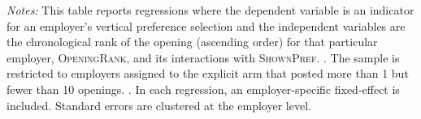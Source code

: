 
\begin{table}[!htbp] \centering 
  \caption{Employer vertical preference signal over time, by treatment assignemnt} 
  \label{tab:employer_choice_fe} 
\begin{minipage}{1\textwidth} 
 \emph{Notes:} This table reports regressions where the dependent variable is an indicator for an employer's vertical preference selection and the independent variables are the chronological rank of the opening (ascending order) for that particular employer, \textsc{OpeningRank}, and its interactions with \textsc{ShownPref}.
\shownprefdef{}.
The sample is restricted to employers assigned to the explicit arm that posted more than 1 but fewer than 10 openings.
\explicitdef{}.
In each regression, an employer-specific fixed-effect is included. 
Standard errors are clustered at the employer level. 
 \starlanguage
 \end{minipage}
\end{table}
